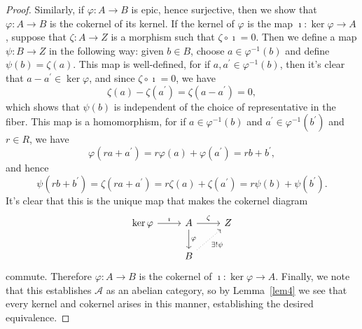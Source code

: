 \documentclass[10pt]{amsart}
\begin{document}
\begin{thm}
\begin{proof}
    Similarly, if $\varphi : A \rightarrow B$ is epic, hence surjective, then we show that $\varphi: A \rightarrow B$ is the cokernel of its kernel.
    If the kernel of $\varphi$ is the map $\imath : \ker\varphi \rightarrow A$, suppose that $\zeta : A \rightarrow Z$ is a morphism such that $\zeta \circ \imath = 0$.
    Then we define a map $\psi : B \rightarrow Z$ in the following way: given $b \in B$, choose $a \in \varphi^{-1}(b)$ and define $\psi(b) = \zeta(a)$.
    This map is well-defined, for if $a, a^\prime \in \varphi^{-1}(b)$, then it's clear that $a - a^\prime \in \ker\varphi$, and since $\zeta \circ \imath = 0$, we have    
    $$\zeta(a) - \zeta(a^\prime) = \zeta(a - a^\prime) = 0,$$
    which shows that $\psi(b)$ is independent of the choice of representative in the fiber.
    This map is a homomorphism, for if $a \in \varphi^{-1}(b)$ and $a^\prime \in \varphi^{-1}(b^\prime)$ and $r \in R$, we have
    $$\varphi(ra + a^\prime) = r\varphi(a) + \varphi(a^\prime) = rb + b^\prime,$$
    and hence
    $$\psi(rb + b^\prime) = \zeta(ra + a^\prime) = r\zeta(a) + \zeta(a^\prime) = r\psi(b) + \psi(b^\prime).$$
    It's clear that this is the unique map that makes the cokernel diagram
    $$\begin{tikzcd}
      \ker\varphi \arrow{r}{\imath} & A \arrow{d}{\varphi} \arrow{r}{\zeta} &Z\\
      & B\arrow[dotted,swap]{ur}{\exists ! \psi}
    \end{tikzcd}$$
    commute.
    Therefore $\varphi : A \rightarrow B$ is the cokernel of $\imath : \ker\varphi \rightarrow A$.
    Finally, we note that this establishes $\mathcal{A}$ as an abelian category, so by Lemma~\ref{lem4} we see that every kernel and cokernel arises in this manner, establishing the desired equivalence.
  \end{proof}
\end{thm}
\end{document}
